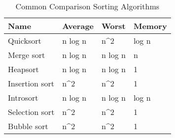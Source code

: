 \begin{center}
	\begin{table}[h]
		\centering
		\label{my-label}
		\begin{tabular}{|l|l|l|l|}
			\hline
			\textbf{Name}  & \textbf{Average}    & \textbf{Worst}      & \textbf{Memory} \\ \hline
			Quicksort      & n log n             & n\textasciicircum 2 & log n           \\ \hline
			Merge sort     & n log n             & n log n             & n               \\ \hline
			Heapsort       & n log n             & n log n             & 1               \\ \hline
			Insertion sort & n\textasciicircum 2 & n\textasciicircum 2 & 1               \\ \hline
			Introsort      & n log n             & n log n             & log n           \\ \hline
			Selection sort & n\textasciicircum 2 & n\textasciicircum 2 & 1               \\ \hline
			Bubble sort    & n\textasciicircum 2 & n\textasciicircum 2 & 1               \\ \hline
		\end{tabular}
		\caption[Common Comparison Sorting Algorithms]{Common Comparison Sorting Algorithms}
	\end{table}
\end{center}